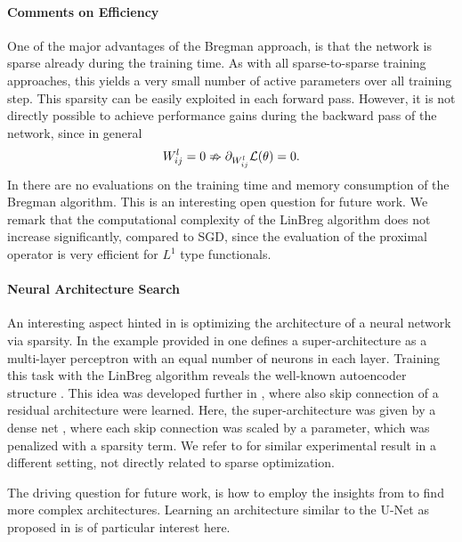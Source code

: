 \paragraph{Comments on Efficiency} One of the major advantages of the Bregman approach, is that the network is sparse already during the training time. As with all sparse-to-sparse training approaches, this yields a very small number of active parameters over all training step. This sparsity can be easily exploited in each forward pass. However, it is not directly possible to achieve performance gains during the backward pass of the network, since in general
%
\begin{align*}
W^l_{ij} = 0 \nRightarrow \partial_{W^l_{ij}} \mathcal{L}(\theta) = 0.
\end{align*}
%
In \cite{bungert2022bregman, bungert2021neural} there are no evaluations on the training time and memory consumption of the Bregman algorithm. This is an interesting open question for future work. We remark that the computational complexity of the LinBreg algorithm does not increase significantly, compared to SGD, since the evaluation of the proximal operator is very efficient for $L^1$ type functionals.

\paragraph{Neural Architecture Search} An interesting aspect hinted in \cite{bungert2022bregman} is optimizing the architecture of a neural network via sparsity. In the example provided in \cite[Fig. 4]{bungert2022bregman} one defines a super-architecture as a multi-layer perceptron with an equal number of neurons in each layer. Training this task with the LinBreg algorithm reveals the well-known autoencoder structure \cite{hinton1993autoencoders}. This idea was developed further in \cite{bungert2021neural}, where also skip connection of a residual architecture were learned. Here, the super-architecture was given by a dense net \cite{huang2017densely}, where each skip connection was scaled by a parameter, which was penalized with a sparsity term. We refer to \cite{cipriani2023neurodes} for similar experimental result in a different setting, not directly related to sparse optimization.

The driving question for future work, is how to employ the insights from \cite{bungert2021neural} to find more complex architectures. Learning an architecture similar to the U-Net as proposed in \cite{ronneberger2015u} is of particular interest here.
%
%
%
%
